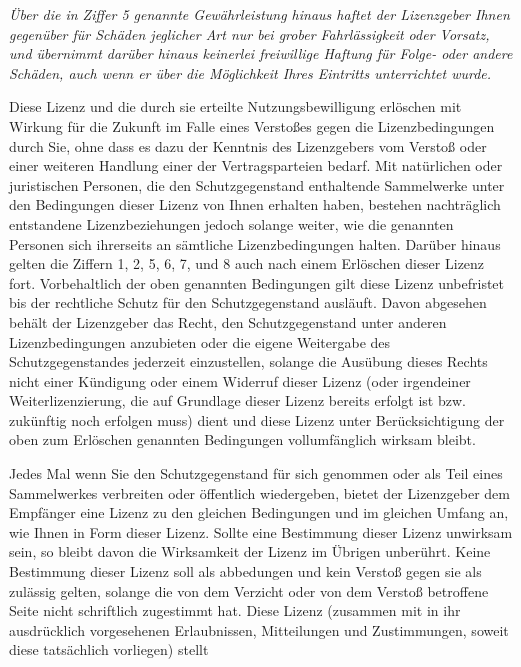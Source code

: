 \begin{description}
  {\itshape Über die in Ziffer 5 genannte Gewährleistung
  hinaus haftet der Lizenzgeber Ihnen gegenüber für Schäden jeglicher Art
  nur bei grober Fahrlässigkeit oder Vorsatz, und übernimmt
  darüber hinaus keinerlei freiwillige Haftung für Folge- oder
  andere Schäden, auch wenn er über die Möglichkeit Ihres
  Eintritts unterrichtet wurde.}
  \item[7. Erlöschen]
  Diese Lizenz und die durch sie erteilte
  Nutzungsbewilligung erlöschen mit Wirkung für die
  Zukunft im Falle eines Verstoßes gegen die
  Lizenzbedingungen durch Sie, ohne dass es dazu der
  Kenntnis des Lizenzgebers vom Verstoß oder einer
  weiteren Handlung einer der Vertragsparteien bedarf. Mit
  natürlichen oder juristischen Personen, die den
  Schutzgegenstand enthaltende Sammelwerke unter den
  Bedingungen dieser Lizenz von Ihnen erhalten haben,
  bestehen nachträglich entstandene Lizenzbeziehungen
  jedoch solange weiter, wie die genannten Personen sich
  ihrerseits an sämtliche Lizenzbedingungen halten.
  Darüber hinaus gelten die Ziffern 1, 2, 5, 6, 7, und 8
  auch nach einem Erlöschen dieser Lizenz fort.
  Vorbehaltlich der oben genannten Bedingungen gilt diese
  Lizenz unbefristet bis der rechtliche Schutz für den
  Schutzgegenstand ausläuft. Davon abgesehen behält der
  Lizenzgeber das Recht, den Schutzgegenstand unter
  anderen Lizenzbedingungen anzubieten oder die eigene
  Weitergabe des Schutzgegenstandes jederzeit
  einzustellen, solange die Ausübung dieses Rechts nicht
  einer Kündigung oder einem Widerruf dieser Lizenz (oder
  irgendeiner Weiterlizenzierung, die auf Grundlage dieser
  Lizenz bereits erfolgt ist bzw. zukünftig noch erfolgen
  muss) dient und diese Lizenz unter Berücksichtigung der
  oben zum Erlöschen genannten Bedingungen vollumfänglich
  wirksam bleibt.
  \item[8. Sonstige ]
  Jedes Mal wenn Sie den Schutzgegenstand für sich
  genommen oder als Teil eines Sammelwerkes verbreiten
  oder öffentlich wiedergeben, bietet der Lizenzgeber dem
  Empfänger eine Lizenz zu den gleichen Bedingungen und im
  gleichen Umfang an, wie Ihnen in Form dieser Lizenz.
  Sollte eine Bestimmung dieser Lizenz unwirksam sein, so
  bleibt davon die Wirksamkeit der Lizenz im Übrigen
  unberührt.
  Keine Bestimmung dieser Lizenz soll als abbedungen und
  kein Verstoß gegen sie als zulässig gelten, solange die
  von dem Verzicht oder von dem Verstoß betroffene Seite
  nicht schriftlich zugestimmt hat.
  Diese Lizenz (zusammen mit in ihr ausdrücklich
  vorgesehenen Erlaubnissen, Mitteilungen und
  Zustimmungen, soweit diese tatsächlich vorliegen) stellt

\end{description}
